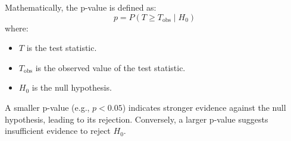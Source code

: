 \documentclass[a4paper, 12pt]{article}
\begin{document}
Mathematically, the p-value is defined as:
\[
p = P(T \geq T_{\text{obs}} \mid H_0)
\]
where:
\begin{itemize}
    \item \(T\) is the test statistic.
    \item \(T_{\text{obs}}\) is the observed value of the test statistic.
    \item \(H_0\) is the null hypothesis.
\end{itemize}

A smaller p-value (e.g., \(p < 0.05\)) indicates stronger evidence against the null hypothesis, leading to its rejection. Conversely, a larger p-value suggests insufficient evidence to reject \(H_0\). \cite{pearson1900}
\end{document}
